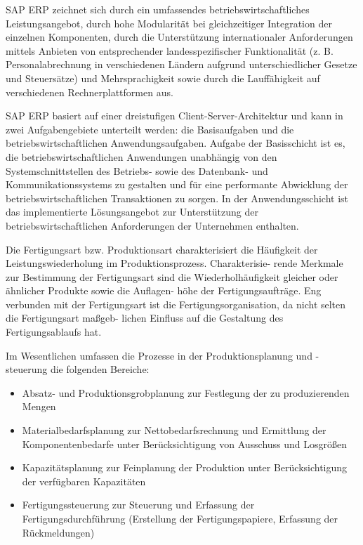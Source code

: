 SAP ERP zeichnet sich durch ein umfassendes betriebswirtschaftliches Leistungsangebot, durch hohe Modularität bei gleichzeitiger Integration der einzelnen Komponenten, durch die Unterstützung internationaler Anforderungen mittels Anbieten von entsprechender landesspezifischer Funktionalität (z. B. Personalabrechnung in verschiedenen Ländern aufgrund unterschiedlicher Gesetze und Steuersätze) und Mehrsprachigkeit sowie durch die Lauffähigkeit auf verschiedenen Rechnerplattformen aus.

SAP ERP basiert auf einer dreistufigen Client-Server-Architektur und kann in zwei Aufgabengebiete unterteilt werden: die Basisaufgaben und die betriebswirtschaftlichen Anwendungsaufgaben. Aufgabe der Basisschicht ist es, die betriebswirtschaftlichen Anwendungen unabhängig von den Systemschnittstellen des Betriebs- sowie des Datenbank- und Kommunikationssystems zu gestalten und für eine performante Abwicklung der betriebswirtschaftlichen Transaktionen zu sorgen. In der Anwendungsschicht ist das implementierte Lösungsangebot zur Unterstützung der betriebswirtschaftlichen Anforderungen der Unternehmen enthalten.

Die Fertigungsart bzw. Produktionsart charakterisiert die Häufigkeit der Leistungswiederholung im Produktionsprozess. Charakterisie- rende Merkmale zur Bestimmung der Fertigungsart sind die Wiederholhäufigkeit gleicher oder ähnlicher Produkte sowie die Auflagen- höhe der Fertigungsaufträge. Eng verbunden mit der Fertigungsart ist die Fertigungsorganisation, da nicht selten die Fertigungsart maßgeb- lichen Einfluss auf die Gestaltung des Fertigungsablaufs hat. 

Im Wesentlichen umfassen die Prozesse in der Produktionsplanung 
und -steuerung die folgenden Bereiche:

\begin{itemize}
    \item 
    Absatz- und Produktionsgrobplanung zur Festlegung der zu produzierenden Mengen
    \item 
    Materialbedarfsplanung zur Nettobedarfsrechnung und Ermittlung der Komponentenbedarfe unter Berücksichtigung von Ausschuss und Losgrößen
    \item 
    Kapazitätsplanung zur Feinplanung der Produktion unter Berücksichtigung der verfügbaren Kapazitäten
    \item 
    Fertigungssteuerung zur Steuerung und Erfassung der Fertigungsdurchführung (Erstellung der Fertigungspapiere, Erfassung der Rückmeldungen)
\end{itemize}


